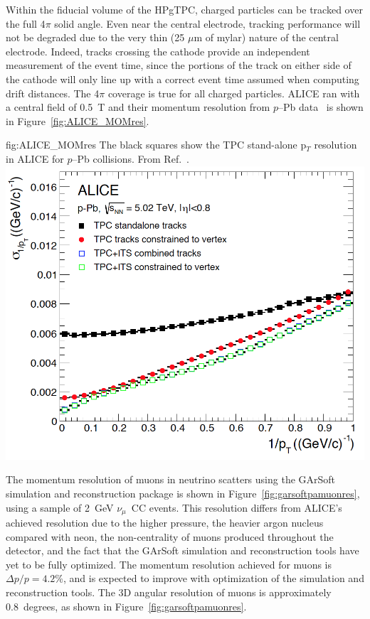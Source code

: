 Within the fiducial volume of the HPgTPC, charged particles can be tracked over the full 4$\pi$ solid angle.  Even near the central electrode, tracking performance will not be degraded due to the very thin (25 $\mu$m of mylar) nature of the central electrode.   Indeed, tracks crossing the cathode provide an independent measurement of the event time, since the portions of the track on either side of the cathode will only line up with a correct event time assumed when computing drift distances. The 4$\pi$ coverage is true for all charged particles.  ALICE ran with a central field of 0.5~T and their momentum resolution from $p$--Pb data~\cite{Abelev:2014ffa} is shown in Figure~\ref{fig:ALICE_MOMres}.
%
\begin{dunefigure}{fig:ALICE_MOMres}
{The black squares show the TPC stand-alone p$_T$ resolution in ALICE for $p$--Pb collisions. From Ref.~\cite{Abelev:2014ffa}.}
\includegraphics[width=0.65\columnwidth]{graphics/ALICE_mom_res.png}
\end{dunefigure}
%
The momentum resolution of muons in neutrino scatters using the GArSoft simulation and reconstruction package is shown in Figure~\ref{fig:garsoftpamuonres}, using a sample of 2~GeV $\nu_\mu$~CC events.  This resolution differs from ALICE's achieved resolution due to the higher pressure, the heavier argon nucleus compared with neon, the non-centrality of muons produced throughout the detector, and the fact that the GArSoft simulation and reconstruction tools have yet to be fully optimized.  The momentum resolution achieved for muons is $\Delta p/p = 4.2$\%, and is expected to improve with optimization of the simulation and reconstruction tools.  The 3D angular resolution of muons is approximately 0.8~degrees, as shown in Figure~\ref{fig:garsoftpamuonres}. 



